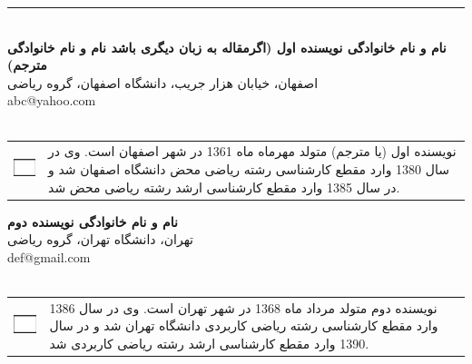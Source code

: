 \documentclass[11pt, twoside]{imsproc}
\begin{document}
\noindent \rule{.4\linewidth}{0.8pt}\\
\noindent\footnotesize{\bfseries نام و نام خانوادگی نویسنده اول (اگرمقاله به زبان دیگری باشد نام و نام خانوادگی مترجم) } \\
\footnotesize{اصفهان، خيابان هزار جريب، دانشگاه اصفهان، گروه ریاضی } \\
abc@yahoo.com\\\\
\begin{tabular}{p{2 cm} p{14 cm} }
\includegraphics[width=20mm]{Image1} 
&\vspace{-2.7cm}
\footnotesize

نویسنده اول (یا مترجم) متولد مهرماه ماه 1361 در شهر اصفهان است. وی در سال 1380 وارد مقطع كارشناسی رشته رياضی محض دانشگاه اصفهان شد و در سال 1385 وارد مقطع كارشناسی ارشد رشته رياضی محض شد.\\
\end{tabular}
\noindent\footnotesize{\bfseries نام و نام خانوادگی نویسنده دوم } \\
\footnotesize{تهران، دانشگاه تهران، گروه ریاضی } \\
 def@gmail.com\\\\
\begin{tabular}{p{2 cm} p{14 cm} }
\includegraphics[width=20mm]{Image2} 
&\vspace{-2.7cm}
\footnotesize

نویسنده دوم متولد مرداد ماه 1368 در شهر تهران است. وی در سال 1386 وارد مقطع كارشناسی رشته رياضی كاربردی دانشگاه تهران شد و در سال 1390  وارد مقطع كارشناسی ارشد رشته رياضی كاربردی شد.
\end{tabular}
\end{document}
